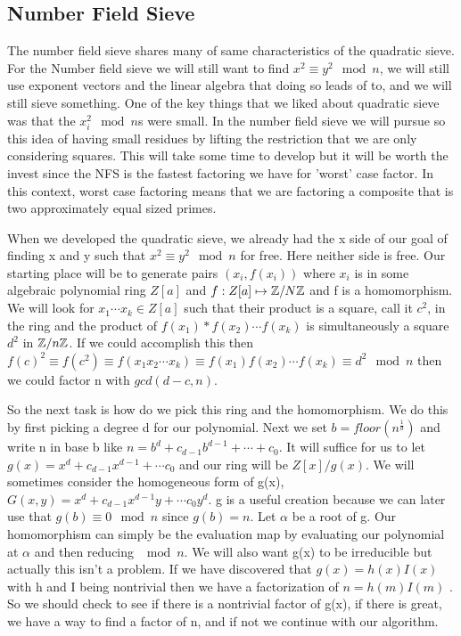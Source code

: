 \documentclass{article}
\begin{document}
\subsection{Number Field Sieve}
The number field sieve shares many of same characteristics of the quadratic sieve. For the Number field sieve we will still want to find $x^2 \equiv y^2 \mod n$, we will still use exponent vectors and the linear algebra that doing so leads of to, and we will still sieve something. One of the key things that we liked about quadratic sieve was that the $x_i^2 \mod n$s were small. In the number field sieve we will pursue so this idea of having small residues by lifting the restriction that we are only considering squares. This will take some time to develop but it will be worth the invest since the NFS is the fastest factoring we have for 'worst' case factor. In this context,  worst case factoring means that we are factoring a composite that is two approximately equal sized primes. 

When we developed the quadratic sieve, we already had the x side of our goal of finding x and y such that $x^2 \equiv y^2 \mod n$ for free. Here neither side is free. Our starting place will be to generate pairs $(x_i, f(x_i))$ where $x_i$ is in some algebraic polynomial ring $Z[a]$ and $f : Z[a] \mapsto \mathbb{Z} / N \mathbb{Z} $ and f is a homomorphism. We will look for $x_1 \cdots x_k \in Z[a]$ such that their product is a square, call it $c^2$, in the ring and the product of $f(x_1) * f(x_2) \cdots f(x_k)$ is simultaneously a square $d^2$  in $\mathbb{Z} / n \mathbb{Z}$. If we could accomplish this then $f(c)^2 \equiv f(c^2 ) \equiv f(x_1 x_2 \cdots x_k) \equiv f(x_1) f(x_2) \cdots f(x_k) \equiv d^2 \mod n $ then we could factor n with $gcd(d - c,  n)$. 

So the next task is how do we pick this ring and the homomorphism. We do this by first picking a degree d for our polynomial. Next we set $b = floor( n^{\frac{1}{d}} )$ and write n in base b like $n = b^d + c_{d-1} b^{d-1} + \cdots + c_0$. It will suffice for us to let $g(x) = x^d + c_{d-1} x^{d-1} + \cdots c_0$ and our ring will be $Z[x]/g(x)$. We will sometimes consider the homogeneous form of g(x), $G(x,y) = x^d + c_{d-1} x^{d-1} y + \cdots c_0 y^d$.  g is a useful creation because we can later use that $g(b) \equiv 0 \mod n$ since $g(b) = n$.  Let $\alpha$ be a root of g. Our homomorphism can simply be the evaluation map by evaluating our polynomial at $\alpha$ and then reducing $\mod n$. We will also want g(x) to be irreducible but actually this isn't a problem. If we have discovered that $g(x) = h(x) I(x)$ with h and I being nontrivial then we have a factorization of $n = h(m) I(m)$ \cite{!!!}. So we should check to see if there is a nontrivial factor of g(x), if there is great, we have a way to find a factor of n, and if not we continue with our algorithm. 
\end{document}
